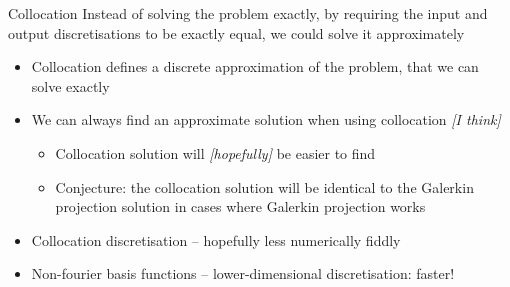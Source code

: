 \documentclass[presentation]{beamer}
\begin{document}
\begin{frame}[label={sec:org0919a72}]{Collocation}
Instead of solving the problem exactly, by requiring the input and output discretisations to be exactly equal, we could solve it approximately
\vfill
\begin{itemize}
\item Collocation defines a discrete approximation of the problem, that we can solve exactly
\end{itemize}
\vfill
\begin{itemize}
\item We can always find an approximate solution when using collocation \emph{[I think]}
\begin{itemize}
\item Collocation solution will \emph{[hopefully]} be easier to find
\item Conjecture: the collocation solution will be identical to the Galerkin projection solution in cases where Galerkin projection works
\end{itemize}
\end{itemize}
\vfill
\begin{itemize}
\item Collocation discretisation -- hopefully less numerically fiddly
\item Non-fourier basis functions -- lower-dimensional discretisation: faster!
\end{itemize}
\end{frame}
\end{document}
